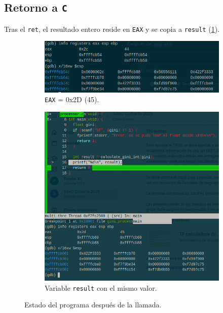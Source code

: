 \documentclass[a4paper,12pt]{article}
\begin{document}
\subsection{Retorno a \texttt{C}}
Tras el \texttt{ret}, el resultado entero reside en \texttt{EAX} y se copia a
\texttt{result} (\cref{fig:after}).  

\begin{figure}[H]
  \centering
  \begin{subfigure}{0.48\textwidth}
    \includegraphics[width=\linewidth]{afterasm.png}
    \caption{\texttt{EAX} = 0x2D (45).}
  \end{subfigure}
  \hfill
  \begin{subfigure}{0.48\textwidth}
    \includegraphics[width=\linewidth]{afterasm2.png}
    \caption{Variable \texttt{result} con el mismo valor.}
  \end{subfigure}
  \caption{Estado del programa después de la llamada.}
  \label{fig:after}
\end{figure}
\end{document}

